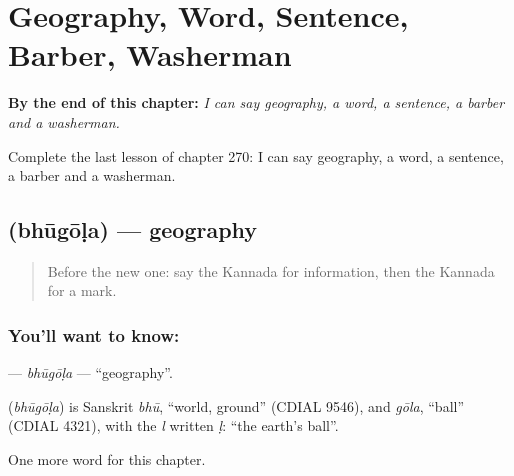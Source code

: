 
\chapter{Geography, Word, Sentence, Barber, Washerman}
\label{ch:ka-geography-word-sentence-barber-washerman}

\begin{chapteropening}
\textbf{By the end of this chapter:} \emph{I can say geography, a word, a sentence, a barber and a washerman.}

Complete the last lesson of chapter 270: I can say geography, a word, a sentence, a barber and a washerman.
\end{chapteropening}

\section[\texorpdfstring{\kn{ಭೂಗೋಳ} (bhūgōḷa)}{ಭೂಗೋಳ (bhūgōḷa)}]{ (bhūgōḷa) — geography}

\label{lesson:KA-C270-bhugola}



\begin{quote}
Before the new one: say the Kannada for information, then the Kannada for a mark.
\end{quote}

\subsection*{You'll want to know: }
\textbf{} — \emph{bhūgōḷa} — \textquotedblleft{}geography\textquotedblright{}.

\begin{cousinweb}
\textbf{} (\emph{bhūgōḷa}) is Sanskrit \emph{bhū}, \textquotedblleft{}world, ground\textquotedblright{} (CDIAL 9546), and \emph{gōla}, \textquotedblleft{}ball\textquotedblright{} (CDIAL 4321), with the \emph{l} written \emph{ḷ}: \textquotedblleft{}the earth's ball\textquotedblright{}.
\end{cousinweb}

\begin{grammarlens}[title={What you've built}]
One more word for this chapter.
\end{grammarlens}

